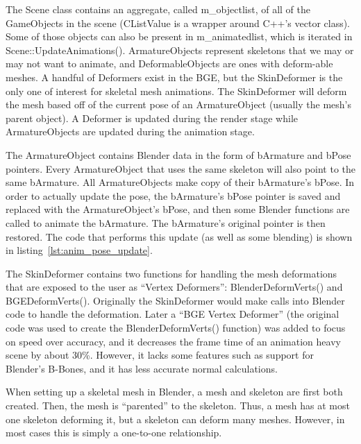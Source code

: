 
The Scene class contains an aggregate, called m\_objectlist, of all of the GameObjects in the scene (CListValue is a wrapper around C++'s vector class).
Some of those objects can also be present in m\_animatedlist, which is iterated in Scene::UpdateAnimations().
ArmatureObjects represent skeletons that we may or may not want to animate, and DeformableObjects are ones with deform-able meshes.
A handful of Deformers exist in the BGE, but the SkinDeformer is the only one of interest for skeletal mesh animations.
The SkinDeformer will deform the mesh based off of the current pose of an ArmatureObject (usually the mesh's parent object).
A Deformer is updated during the render stage while ArmatureObjects are updated during the animation stage.

The ArmatureObject contains Blender data in the form of bArmature and bPose pointers.
Every ArmatureObject that uses the same skeleton will also point to the same bArmature.
All ArmatureObjects make copy of their bArmature's bPose.
In order to actually update the pose, the bArmature's bPose pointer is saved and replaced with the ArmatureObject's bPose, and then some Blender functions are called to animate the bArmature.
The bArmature's original pointer is then restored.
The code that performs this update (as well as some blending) is shown in listing~\ref{lst:anim_pose_update}.


The SkinDeformer contains two functions for handling the mesh deformations that are exposed to the user as ``Vertex Deformers'': BlenderDeformVerts() and BGEDeformVerts().
Originally the SkinDeformer would make calls into Blender code to handle the deformation.
Later a ``BGE Vertex Deformer'' (the original code was used to create the BlenderDeformVerts() function) was added to focus on speed over accuracy, and it decreases the frame time of an animation heavy scene by about 30\%.
However, it lacks some features such as support for Blender's B-Bones, and it has less accurate normal calculations.

When setting up a skeletal mesh in Blender, a mesh and skeleton are first both created.
Then, the mesh is ``parented'' to the skeleton.
Thus, a mesh has at most one skeleton deforming it, but a skeleton can deform many meshes.
However, in most cases this is simply a one-to-one relationship.

